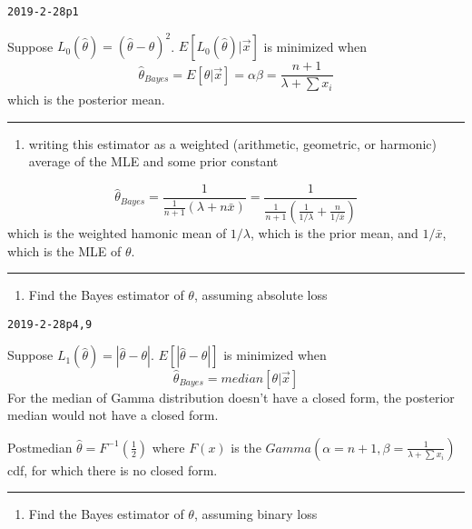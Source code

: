 \documentclass[12pt,]{article}
\providecommand{\tightlist}{%
  \setlength{\itemsep}{0pt}\setlength{\parskip}{0pt}}
\begin{document}
\texttt{2019-2-28p1}

Suppose \(L_0(\hat\theta)=(\hat\theta-\theta)^2\).
\(E[L_0(\hat\theta)|\vec x]\) is minimized when
\[\hat\theta_{Bayes}=E[\theta|\vec x]=\alpha\beta=\frac{n+1}{\lambda+\sum x_i}\]
which is the posterior mean.

\begin{center}\rule{0.5\linewidth}{\linethickness}\end{center}

\begin{enumerate}
\def\labelenumi{\alph{enumi}.}
\setcounter{enumi}{2}
\tightlist
\item
  \textcolor[rgb]{0.5,0.5,0.5}{writing this estimator as a weighted (arithmetic, geometric, or harmonic) average of the MLE and some prior constant}
\end{enumerate}

\[\hat\theta_{Bayes}=\frac1{\frac1{n+1}(\lambda+n\bar x)}=\frac1{\frac1{n+1}(\frac1{1/\lambda}+\frac{n}{1/\bar x})}\]
which is the weighted hamonic mean of \(1/\lambda\), which is the prior
mean, and \(1/\bar x\), which is the MLE of \(\theta\).

\begin{center}\rule{0.5\linewidth}{\linethickness}\end{center}

\begin{enumerate}
\def\labelenumi{\alph{enumi}.}
\setcounter{enumi}{3}
\tightlist
\item
  \textcolor[rgb]{0.5,0.5,0.5}{Find the Bayes estimator of $\theta$, assuming absolute loss}
\end{enumerate}

\texttt{2019-2-28p4,9}

Suppose \(L_1(\hat\theta)=|\hat\theta-\theta|\).
\(E[|\hat\theta-\theta|]\) is minimized when
\[\hat\theta_{Bayes}=median[\theta|\vec x]\] For the median of Gamma
distribution doesn't have a closed form, the posterior median would not
have a closed form.

Postmedian \(\hat\theta=F^{-1}(\frac12)\) where \(F(x)\) is the
\(Gamma(\alpha=n+1,\beta=\frac1{\lambda+\sum x_i})\) cdf, for which
there is no closed form.

\begin{center}\rule{0.5\linewidth}{\linethickness}\end{center}

\begin{enumerate}
\def\labelenumi{\alph{enumi}.}
\setcounter{enumi}{4}
\tightlist
\item
  \textcolor[rgb]{0.5,0.5,0.5}{Find the Bayes estimator of $\theta$, assuming binary loss}
\end{enumerate}
\end{document}
